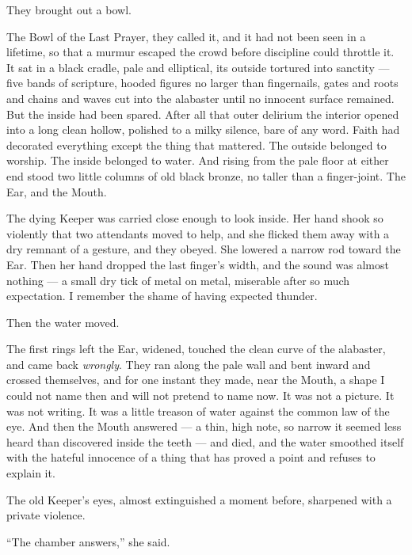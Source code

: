 They brought out a bowl.\par

The Bowl of the Last Prayer, they called it, and it had not been seen in a lifetime, so that a murmur escaped the crowd before discipline could throttle it. It sat in a black cradle, pale and elliptical, its outside tortured into sanctity --- five bands of scripture, hooded figures no larger than fingernails, gates and roots and chains and waves cut into the alabaster until no innocent surface remained. But the inside had been spared. After all that outer delirium the interior opened into a long clean hollow, polished to a milky silence, bare of any word. Faith had decorated everything except the thing that mattered. The outside belonged to worship. The inside belonged to water. And rising from the pale floor at either end stood two little columns of old black bronze, no taller than a finger-joint. The Ear, and the Mouth.\par

The dying Keeper was carried close enough to look inside. Her hand shook so violently that two attendants moved to help, and she flicked them away with a dry remnant of a gesture, and they obeyed. She lowered a narrow rod toward the Ear. Then her hand dropped the last finger's width, and the sound was almost nothing --- a small dry tick of metal on metal, miserable after so much expectation. I remember the shame of having expected thunder.\par

Then the water moved.\par

The first rings left the Ear, widened, touched the clean curve of the alabaster, and came back \textit{wrongly}. They ran along the pale wall and bent inward and crossed themselves, and for one instant they made, near the Mouth, a shape I could not name then and will not pretend to name now. It was not a picture. It was not writing. It was a little treason of water against the common law of the eye. And then the Mouth answered --- a thin, high note, so narrow it seemed less heard than discovered inside the teeth --- and died, and the water smoothed itself with the hateful innocence of a thing that has proved a point and refuses to explain it.\par

The old Keeper's eyes, almost extinguished a moment before, sharpened with a private violence.\par

``The chamber answers,'' she said.\par

